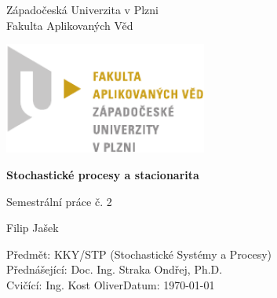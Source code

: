 \begin{titlepage}
    \begin{center}
        \LARGE
        Západočeská Univerzita v Plzni\\
        Fakulta Aplikovaných Věd\\
        
        \vspace{1cm}
        
        \includegraphics[width=0.5\textwidth]{./Graphics/FAV_logo.pdf}
        
        \vspace{4cm}
        
        \textbf{Stochastické procesy a stacionarita}
        
        \vspace{0.5cm}
        Semestrální práce č. 2
        
        \vspace{0.5cm}
        Filip Jašek
        
    \end{center} 
    \vfill
        \noindent
        \large
        Předmět: KKY/STP (Stochastické Systémy a Procesy)\\
        Přednášející: Doc. Ing. Straka Ondřej, Ph.D.\\
        Cvičící: Ing. Kost Oliver\hfill Datum: \today
\end{titlepage}